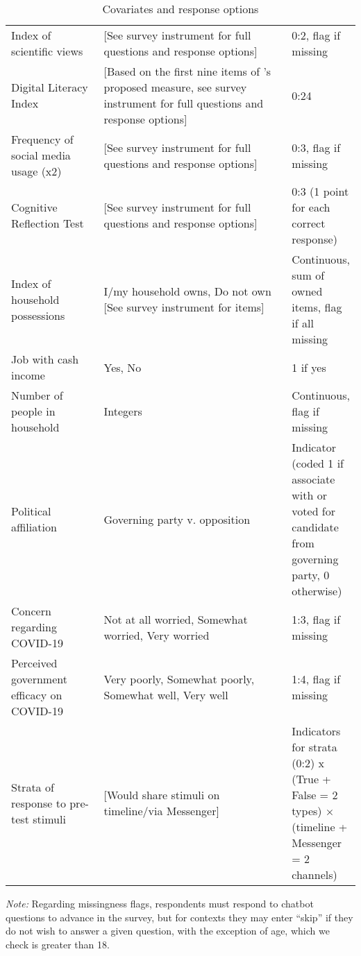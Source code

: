 \begin{table}[H]
\begin{adjustbox}{totalheight=.9\baselineskip, max width = \textwidth}
\begin{tabular}{p{0.3\linewidth}p{0.7\linewidth}p{0.25\linewidth}}
Index   of scientific views                 & [See   survey instrument for full questions and response options] & 0:2, flag if missing                     \\
Digital Literacy Index &  {[}Based on the first nine items of \cite{guessetal2020digital}'s  proposed measure, see  survey instrument for full questions and response options{]}& 0:24\\
Frequency of social media usage (x2)& {[}See   survey instrument for full questions and response options{]} & 0:3, flag if missing \\
Cognitive Reflection Test& {[}See   survey instrument for full questions and response options{]}& 0:3 (1 point for each correct response)\\
Index of household possessions%
&
  I/my household owns, Do not own [See survey instrument for items] &
  Continuous, sum of owned items, flag if all missing \\
Job   with cash income                      & Yes,   No                                                  & 1 if yes                \\
Number   of people in household             & Integers                                                   & Continuous, flag if missing              \\
Political affiliation & Governing party v. opposition & Indicator (coded 1 if associate with or voted for candidate from governing party, 0 otherwise)\\
Concern regarding COVID-19                  & Not at all worried, Somewhat worried,  Very   worried      & 1:3, flag if missing                     \\
Perceived government efficacy   on COVID-19 & Very   poorly, Somewhat poorly, Somewhat well, Very well   & 1:4, flag if missing \\
{Strata of response to pre-test stimuli} & [Would share stimuli on timeline/via Messenger]& Indicators for strata (0:2) x (True + False = 2 types) $\times$ (timeline + Messenger = 2 channels) 
\end{tabular} 
\end{adjustbox}
\footnotesize
\textit{Note:} Regarding missingness flags, respondents must respond to chatbot questions to advance in the survey, but for contexts they may enter ``skip'' if they do not wish to answer a given question, with the exception of age, which we check is greater than 18. 
\caption{Covariates and response options}
\label{cov_long}
\end{table}